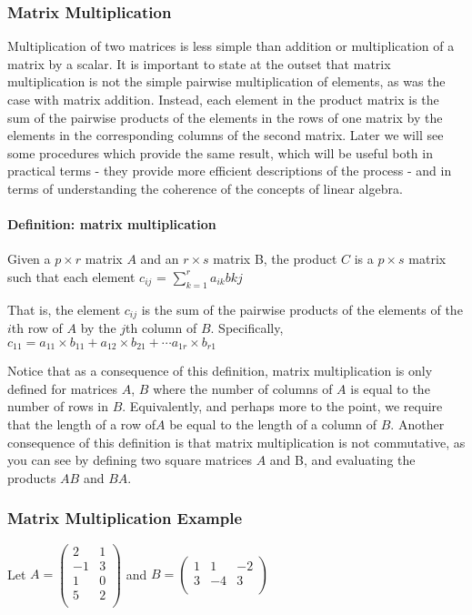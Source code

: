 \documentclass[12pt,letterpaper,final]{article}
\begin{document}
\subsubsection{Matrix Multiplication}
Multiplication of two matrices is less simple than addition or multiplication of a matrix by a scalar. It is important to state at the outset that matrix multiplication is not the simple pairwise multiplication of elements, as was the case with matrix addition. Instead, each element in the product matrix is the sum of the pairwise products of the elements in the rows of one matrix by the elements in the corresponding columns of the second matrix. 
Later we will see some procedures which provide the same result, which will be useful both in practical terms - they provide more efficient descriptions of the process - and in terms of understanding the coherence of the concepts of linear algebra. 

\paragraph{Definition: matrix multiplication}Given a $p \times r$ matrix $A$ and an $r \times s$ matrix B, the product $C$ is a $p \times s$ matrix such that each element $c_{ij}$ = $\sum_{k=1}^{r} a_{ik}b{kj}$

That is, the element $c_{ij}$ is the sum of the pairwise products of the elements of the $i$th row of $A$ by the $j$th column of $B$. Specifically, 
$c_{11} = a_{11} \times b_{11} + a_{12} \times b_{21} + \cdots a_{1r} \times b_{r1} $

Notice that as a consequence of this definition, matrix multiplication is only defined for matrices $A$, $B$ where the number of columns of $A$ is equal to the number of rows in $B$. Equivalently, and perhaps more to the point, we require that the length of a row of$A$ be equal to the length of a column of $B$. 
 Another consequence of this definition is that matrix multiplication is not commutative, as you can see by defining two square matrices $A$ and B, and evaluating the products $AB$ and $BA$. 

\subsubsection{Matrix Multiplication Example}
Let $A =
 \begin{pmatrix}
2 & 1 \\-1 & 3 \\1 & 0\\5 & 2\\
 \end{pmatrix}
$
and $B = 
 \begin{pmatrix}
 1 & 1 & -2\\ 3 & -4 & 3\\
 \end{pmatrix}
$
\end{document}
